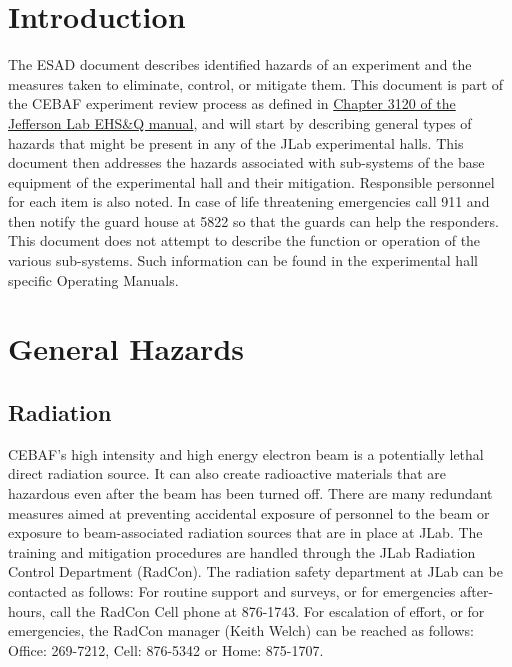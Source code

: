 
%
%

\chapter{Introduction}

The ESAD document describes identified hazards of an experiment and the measures taken to eliminate, control, or mitigate them.
This document is part of the CEBAF experiment review process as defined in
\href{http://www.jlab.org/ehs/ehsmanual/manual/3120.html}{Chapter 3120 of the Jefferson Lab EHS\&Q manual},
and will start by describing general types of hazards that might be present in any of the  
JLab experimental halls.  This document then addresses the hazards associated 
with sub-systems of the base equipment of the experimental hall and their 
mitigation.  Responsible personnel for each item is also noted.  
In case of life threatening 
emergencies call 911 and then notify the guard house at 5822 so that the guards can help
the responders.  This document does not attempt to describe the function 
or operation of the various sub-systems. Such information can be found in
the experimental hall specific Operating Manuals.


\chapter{General Hazards}

\section{Radiation}
	
CEBAF's high intensity and high energy electron beam is a potentially lethal direct radiation source. 
It can also create radioactive materials that are hazardous even  after the beam has been turned off. 
There are many redundant measures aimed at preventing accidental exposure of personnel to the beam 
or exposure to beam-associated radiation sources that are in place at JLab. The training and mitigation 
procedures are handled through the JLab Radiation Control Department (RadCon). The radiation safety 
department at JLab can be contacted as follows: For routine support and surveys, or for emergencies 
after-hours, call the RadCon Cell phone at 876-1743. For escalation of effort, or for emergencies, 
the RadCon manager (Keith Welch) can be reached as follows: Office: 269-7212, Cell: 876-5342 or Home:  875-1707.

